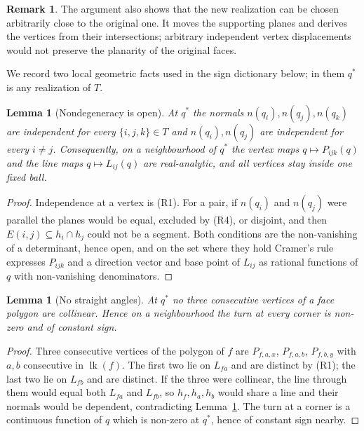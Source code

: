 \documentclass[11pt,reqno]{amsart}
\theoremstyle{plain}
\newtheorem{lemma}[theorem]{Lemma}
\theoremstyle{definition}
\newtheorem{remark}[theorem]{Remark}
\newcommand{\link}{\operatorname{lk}}
\begin{document}
\begin{remark}
The argument also shows that the new realization can be chosen arbitrarily close to the original
one. It moves the supporting planes and derives the vertices from their intersections; arbitrary
independent vertex displacements would not preserve the planarity of the original faces.
\end{remark}

We record two local geometric facts used in the sign dictionary below; in them $q^{*}$ is any
realization of $T$.

\begin{lemma}[Nondegeneracy is open]\label{lem:step1}
At $q^{*}$ the normals $n(q_i),n(q_j),n(q_k)$ are independent for every $\{i,j,k\}\in T$ and
$n(q_i),n(q_j)$ are independent for every $i\ne j$. Consequently, on a neighbourhood of $q^{*}$ the
vertex maps $q\mapsto P_{ijk}(q)$ and the line maps $q\mapsto L_{ij}(q)$ are real-analytic, and all
vertices stay inside one fixed ball.
\end{lemma}

\begin{proof}
Independence at a vertex is (R1). For a pair, if $n(q_i)$ and $n(q_j)$ were parallel the planes
would be equal, excluded by (R4), or disjoint, and then $E(i,j)\subseteq h_i\cap h_j$ could not be a
segment. Both conditions are the non-vanishing of a determinant, hence open, and on the set where they
hold Cramer's rule expresses $P_{ijk}$ and a direction vector and base point of $L_{ij}$ as rational
functions of $q$ with non-vanishing denominators.
\end{proof}

\begin{lemma}[No straight angles]\label{lem:step2}
At $q^{*}$ no three consecutive vertices of a face polygon are collinear. Hence on a neighbourhood the
turn at every corner is non-zero and of constant sign.
\end{lemma}

\begin{proof}
Three consecutive vertices of the polygon of $f$ are $P_{f,a,x}$, $P_{f,a,b}$, $P_{f,b,y}$ with $a,b$
consecutive in $\link(f)$. The first two lie on $L_{fa}$ and are distinct by (R1); the last two lie on
$L_{fb}$ and are distinct. If the three were collinear, the line through them would equal both
$L_{fa}$ and $L_{fb}$, so $h_f,h_a,h_b$ would share a line and their normals would be dependent,
contradicting Lemma~\ref{lem:step1}. The turn at a corner is a continuous function of $q$ which is
non-zero at $q^{*}$, hence of constant sign nearby.
\end{proof}
\end{document}
